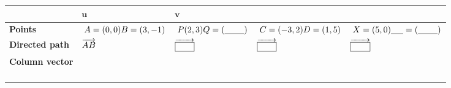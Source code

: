 \documentclass[12pt,a4paper]{article}
\newcommand{\ealkey}[1]{\textcolor{ealkeycolour}{#1}}
\begin{document}
\begin{center}
\small
\begin{tabularx}{\textwidth}{|>{\raggedright\arraybackslash}p{2cm}|>{\centering\arraybackslash}p{2cm}|>{\centering\arraybackslash}p{2cm}|>{\centering\arraybackslash}p{2.2cm}|>{\centering\arraybackslash}p{2.2cm}|}
\hline
& \textbf{\(\mathbf{u}\)} & \textbf{\(\mathbf{v}\)} & \textbf{\underline{\hspace{1.6cm}} } & \textbf{\underline{\hspace{1.6cm}} } \\
\hline

\textbf{Points } 
&
\(\;A = (0,0) \newline B = (3,-1) \)
&
\(\;P(2,3) \newline Q = (\underline{\hspace{0.8cm}})\)
&
\(\;C = (-3,2) \newline D = (1,5)\)
&
\(\;X = (5,0) \newline \underline{\hspace{0.5cm}} = (\underline{\hspace{0.8cm}})\)
\\
\hline

\textbf{\ealkey{Directed path}}
&
\( \newline \overrightarrow{AB} \)
&
\(\newline \overrightarrow{\boxed{\phantom{aaa}}} \)
&
\(\newline \overrightarrow{\boxed{\phantom{aaa}}} \)
&
\(\newline \overrightarrow{\boxed{\phantom{aaa}}} \)
\\
\hline



\textbf{\ealkey{Column vector}}
&
\(\begin{pmatrix} 3 \\ -1 \end{pmatrix}\)
&
\(\begin{pmatrix} 5 \\ 3 \end{pmatrix}\)
&
\(\begin{pmatrix}
\underline{\hspace{0.5cm}} \\[4pt]
\underline{\hspace{0.5cm}}
\end{pmatrix}\)
&
\(\begin{pmatrix}
\underline{\hspace{0.5cm}} \\[4pt]
\underline{\hspace{0.5cm}}
\end{pmatrix}\)
\\
\hline
\end{tabularx}
\end{center}
\end{document}
